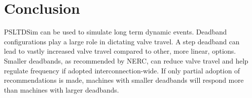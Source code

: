 \section{Conclusion}
PSLTDSim can be used to simulate long term dynamic events.
Deadband configurations play a large role in dictating valve travel.
A step deadband can lead to vastly increased valve travel compared to other, more linear, options.
Smaller deadbands, as recommended by NERC, can reduce valve travel and help regulate frequency if adopted interconnection-wide.
If only partial adoption of recommendations is made, machines with smaller deadbands will respond more than machines with larger deadbands.
